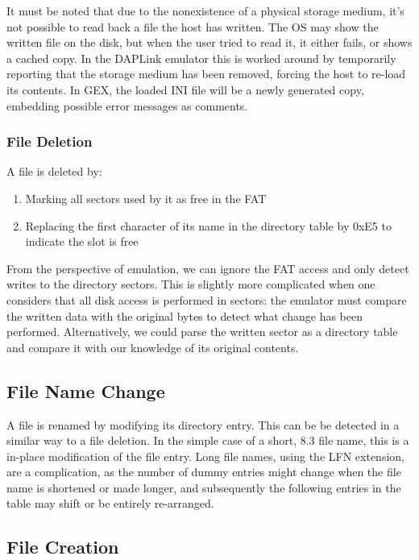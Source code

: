It must be noted that due to the nonexistence of a physical storage medium, it's not possible to read back a file the host has written. The OS may show the written file on the disk, but when the user tried to read it, it either fails, or shows a cached copy. In the DAPLink emulator this is worked around by temporarily reporting that the storage medium has been removed, forcing the host to re-load its contents. In GEX, the loaded INI file will be a newly generated copy, embedding possible error messages as comments.

\subsubsection{File Deletion}

A file is deleted by:

\begin{enumerate}
	\item Marking all sectors used by it as free in the FAT
	\item Replacing the first character of its name in the directory table by 0xE5 to indicate the slot is free
\end{enumerate} 

From the perspective of emulation, we can ignore the FAT access and only detect writes to the directory sectors. This is slightly more complicated when one considers that all disk access is performed in sectors: the emulator must compare the written data with the original bytes to detect what change has been performed. Alternatively, we could parse the written sector as a directory table and compare it with our knowledge of its original contents.

\subsection{File Name Change}

A file is renamed by modifying its directory entry. This can be be detected in a similar way to a file deletion. In the simple case of a short, 8.3 file name, this is a in-place modification of the file entry. Long file names, using the LFN extension, are a complication, as the number of dummy entries might change when the file name is shortened or made longer, and subsequently the following entries in the table may shift or be entirely re-arranged.

\subsection{File Creation}

